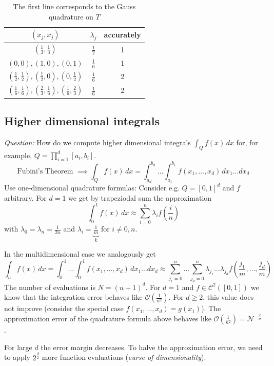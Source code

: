 \documentclass[a4paper]{article}
\numberwithin{lecref}{section}
\theoremstyle{break}
\begin{document}
\begin{table}[t]
  \begin{center}
    \begin{tabular}{ccc}
      $(x_j, x_j)$ & $\lambda_j$ & accurately \\
    \hline
      $(\frac 13, \frac 13)$ & $\frac12$ & 1 \\
      $(0, 0), (1, 0), (0, 1)$ & $\frac 16$ & 1 \\
      $(\frac12, \frac12), (\frac12, 0), (0, \frac12)$ & $\frac16$ & 2 \\
      $(\frac16, \frac16), (\frac23, \frac16), (\frac16, \frac23)$ & $\frac16$ & 2
    \end{tabular}
    \caption{The first line corresponds to the Gauss quadrature on $T$}
  \end{center}
\end{table}

\subsection{Higher dimensional integrals}

\emph{Question:} How do we compute higher dimensional integrals $\int_Q f(x) \, dx$ for, for example, $Q = \prod_{i=1}^{d} [a_i, b_i]$.
\[ \text{Fubini's Theorem } \implies \int_Q f(x) \, dx = \int_{a_d}^{b_d} \dots \int_{a_1}^{b_1} f(x_1, \dots, x_d) \, dx_1 \dots dx_d \]
Use one-dimensional quadrature formulas:
Consider e.g. $Q = [0, 1]^d$ and $f$ arbitrary. For $d=1$ we get by trapeziodal sum the approximation
\[ \int_0^1 f(x) \, dx \approx \sum_{i=0}^n \lambda_i f\left(\frac in\right) \]
with $\lambda_0 = \lambda_n = \frac1{2n}$ and $\lambda_i = \underbrace{\frac1m}_{k}$ for $i \neq 0, n$.

In the multidimensional case we analogously get
\[ \int_a f(x) \, dx = \int_0^1 \dots \int_0^1 f(x_1, \dots, x_d) \, dx_1 \dots dx_d \approx \sum_{j_1=0}^n \dots \sum_{j_d=0}^n \lambda_{j_1} \dots \lambda_{j_d} f\left(\frac{j_1}{m}, \dots, \frac{j_d}{m}\right) \]
The number of evaluations is $N = (n+1)^d$. For $d = 1$ and $f \in \mathcal C^2([0, 1])$ we know that the integration error behaves like $\mathcal O(\frac1{n^2})$. For $d \geq 2$, this value does not improve (consider the special case $f(x_1, \dots, x_d) = g(x_1)$). The approximation error of the quadrature formula above behaves like $\mathcal O(\frac 1{n^2}) = \mathcal{N^{-\frac 2d}}$.

For large $d$ the error margin decreases. To halve the approximation error, we need to apply $2^{\frac d2}$ more function evaluations (\emph{curse of dimensionality}).
\end{document}
